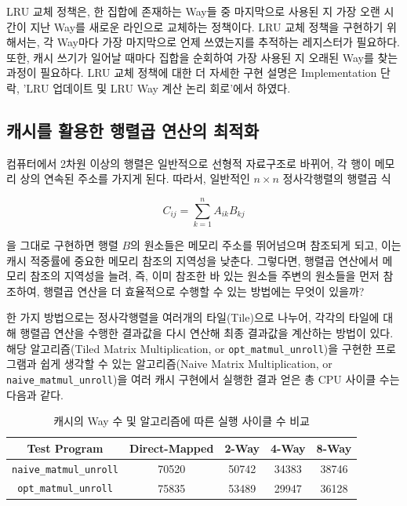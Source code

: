 \documentclass[openright, a4paper]{article}
\newcommand{\code}[1]{\texttt{#1}}
\begin{document}
LRU 교체 정책은, 한 집합에 존재하는 Way들 중 마지막으로 사용된 지 가장 오랜 
시간이 지난 Way를 새로운 라인으로 교체하는 정책이다. LRU 교체 정책을 구현하기
위해서는, 각 Way마다 가장 마지막으로 언제 쓰였는지를 추적하는 레지스터가 
필요하다. 또한, 캐시 쓰기가 일어날 때마다 집합을 순회하여 가장 사용된 지 오래된
Way를 찾는 과정이 필요하다. LRU 교체 정책에 대한 더 자세한 구현 설명은 
Implementation 단락, 'LRU 업데이트 및 LRU Way 계산 논리 회로'에서 하였다. 

\hfill

\subsection{캐시를 활용한 행렬곱 연산의 최적화}

\hfill

컴퓨터에서 2차원 이상의 행렬은 일반적으로 선형적 자료구조로 바뀌어, 각 행이
메모리 상의 연속된 주소를 가지게 된다. 따라서, 일반적인 $n \times n$ 
정사각행렬의 행렬곱 식

\begin{equation}
  C_{ij} = \sum\limits_{k=1}^nA_{ik}B_{kj}
\end{equation}

을 그대로 구현하면 행렬 $B$의 원소들은 메모리 주소를 뛰어넘으며 참조되게 되고,
이는 캐시 적중률에 중요한 메모리 참조의 지역성을 낮춘다. 그렇다면, 행렬곱 
연산에서 메모리 참조의 지역성을 늘려, 즉, 이미 참조한 바 있는 원소들 주변의
원소들을 먼저 참조하여, 행렬곱 연산을 더 효율적으로 수행할 수 있는 방법에는
무엇이 있을까?

한 가지 방법으로는 정사각행렬을 여러개의 타일(Tile)으로 나누어, 각각의 타일에 
대해 행렬곱 연산을 수행한 결과값을 다시 연산해 최종 결과값을 계산하는 방법이
있다. 해당 알고리즘(Tiled Matrix Multiplication, or \code{opt_matmul_unroll})을
구현한 프로그램과 쉽게 생각할 수 있는 알고리즘(Naive Matrix Multiplication, or 
\code {naive_matmul_unroll})을 여러 캐시 구현에서 실행한 결과 얻은
총 CPU 사이클 수는 다음과 같다.

\hfill

\begin{table}[!h]
  \centering
  \begin{tabular}{@{}ccccc@{}}
    \hline
    Test Program & Direct-Mapped & 2-Way & 4-Way & 8-Way \\
    \hline
    \code{naive_matmul_unroll} & 70520 & 50742 & 34383 & 38746 \\
    \code{opt_matmul_unroll} & 75835 & 53489 & 29947 & 36128 \\
    \hline
  \end{tabular}
  \caption{캐시의 Way 수 및 알고리즘에 따른 실행 사이클 수 비교}
  \label{tab:comparison}
\end{table}
\end{document}
